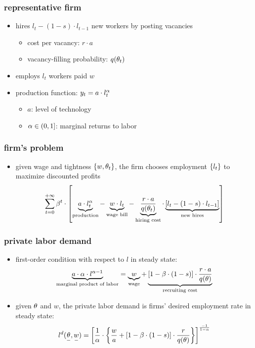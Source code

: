 \documentclass[12pt,xcolor={dvipsnames},hyperref={pdftex,pdfpagemode=UseNone,hidelinks,pdfdisplaydoctitle=true},usepdftitle=false]{beamer}
\begin{document}
\begin{frame}
\frametitle{representative firm}
\begin{itemize}
\item hires $l_{t}-(1-s)\cdot l_{t-1}$ new workers by posting vacancies
\begin{itemize}
\item cost per vacancy: $r\cdot a$
\item vacancy-filling probability: $q(\theta_{t})$
\end{itemize}
\item employs $l_{t}$ workers paid $w$
\item production function:  $y_{t}= a\cdot l_{t}^{\alpha}$
\begin{itemize}
\item $a$: level of technology
\item $\alpha\in(0,1]$: marginal returns to labor
\end{itemize}
\end{itemize}
\end{frame}

\begin{frame}
\frametitle{firm's problem}
\begin{itemize}
\item given wage and tightness $\left\lbrace w, \theta_t \right\rbrace$, the firm chooses employment $\left\lbrace l_{t} \right\rbrace$ to maximize discounted profits
\begin{equation*}
\sum_{t=0}^{+\infty} \beta^t \cdot\left[ \underbrace{a \cdot l_t^{\alpha}}_{\text{production}}-\underbrace{w\cdot l_t}_{\text{wage bill}}-\underbrace{\frac{r\cdot a}{q(\theta_{t})}}_{\text{hiring cost}}\cdot \underbrace{\left[ l_{t}-(1-s)\cdot l_{t-1} \right]}_{\text{new hires}} \right]
\end{equation*}
\end{itemize}
\end{frame}

\begin{frame}
\frametitle{private labor demand}
\begin{itemize}
\item first-order condition with respect to $l$ in steady state:
\begin{equation*}
\underbrace{a\cdot\alpha\cdot l^{\alpha-1}}_{\text{marginal product of labor}} = \underbrace{w}_{\text{wage}} +\underbrace{\left[ 1-\beta\cdot (1-s) \right]\cdot \frac{r\cdot a}{q(\theta)}}_{\text{recruiting cost}}
\end{equation*}
\item given $\theta$ and $w$, the private labor demand is firms' desired employment rate in steady state:
\begin{equation*}
l^{d}(\underset{-}{\theta},\underset{-}{w}) = \left[ \frac{1}{\alpha}\cdot \left\lbrace \frac{w}{a}+\left[ 1-\beta\cdot (1-s) \right]\cdot \frac{r}{q(\theta)} \right\rbrace \right]^{\frac{-1}{1-\alpha}}
\end{equation*}
\end{itemize}
\end{frame}
\end{document}
